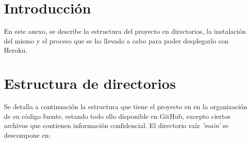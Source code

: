 
\section{Introducción}
En este anexo, se describe la estructura del proyecto en directorios, la instalación del mismo y el proceso que se ha llevado a cabo para poder desplegarlo con Heroku.
\section{Estructura de directorios}
Se detalla a continuación la estructura que tiene el proyecto en en la organización de su código fuente, estando todo ello disponible en GitHub, excepto ciertos archivos que contienen información confidencial.
El directorio raíz \textit{'main'} se descompone en:
